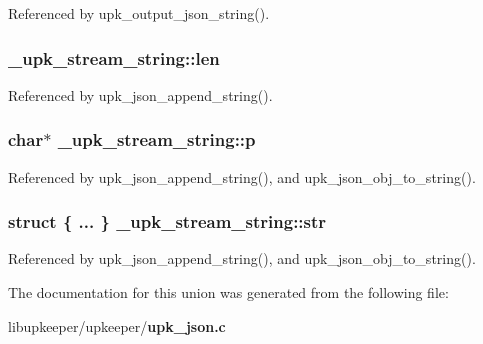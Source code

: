Referenced by upk\_\-output\_\-json\_\-string().

\subsubsection[{len}]{ {\bf \_\-upk\_\-stream\_\-string::len}}\label{union__upk__stream__string_a908d6a9f33d825669019ba7d761b79da}


Referenced by upk\_\-json\_\-append\_\-string().

\subsubsection[{p}]{\setlength{\rightskip}{0pt plus 5cm}char$\ast$ {\bf \_\-upk\_\-stream\_\-string::p}}\label{union__upk__stream__string_a81a3b349f314d5acddf33bb268232af0}


Referenced by upk\_\-json\_\-append\_\-string(), and upk\_\-json\_\-obj\_\-to\_\-string().

\subsubsection[{str}]{\setlength{\rightskip}{0pt plus 5cm}struct \{ ... \}   {\bf \_\-upk\_\-stream\_\-string::str}}\label{union__upk__stream__string_af5999ad19e5f45f28a31cfdc2c3b89bf}


Referenced by upk\_\-json\_\-append\_\-string(), and upk\_\-json\_\-obj\_\-to\_\-string().



The documentation for this union was generated from the following file:\begin{DoxyCompactItemize}
\item 
libupkeeper/upkeeper/{\bf upk\_\-json.c}\end{DoxyCompactItemize}
